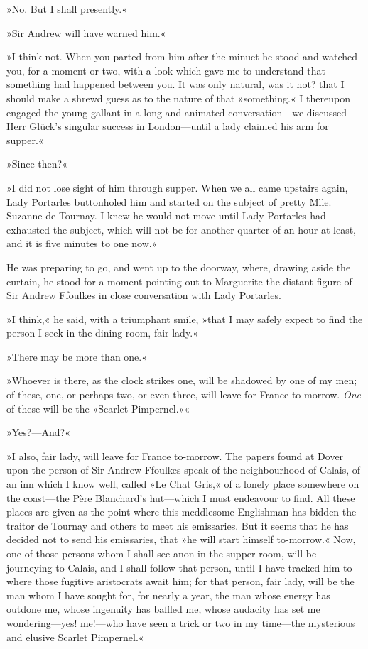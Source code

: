 »No. But I shall presently.«

»Sir Andrew will have warned him.«

»I think not. When you parted from him after the minuet he stood and watched you, for a moment or two, with a look which gave me to understand that something had happened between you. It was only natural, was it not? that I should make a shrewd guess as to the nature of that »something.« I thereupon engaged the young gallant in a long and animated conversation—we discussed Herr Glück's singular success in London—until a lady claimed his arm for supper.«

»Since then?«

»I did not lose sight of him through supper. When we all came upstairs again, Lady Portarles buttonholed him and started on the subject of pretty Mlle. Suzanne de Tournay. I knew he would not move until Lady Portarles had exhausted the subject, which will not be for another quarter of an hour at least, and it is five minutes to one now.«

He was preparing to go, and went up to the doorway, where, drawing aside the curtain, he stood for a moment pointing out to Marguerite the distant figure of Sir Andrew Ffoulkes in close conversation with Lady Portarles.

»I think,« he said, with a triumphant smile, »that I may safely expect to find the person I seek in the dining-room, fair lady.«

»There may be more than one.«

»Whoever is there, as the clock strikes one, will be shadowed by one of my men; of these, one, or perhaps two, or even three, will leave for France to-morrow. \textit{One} of these will be the »Scarlet Pimpernel.««

»Yes?—And?«

»I also, fair lady, will leave for France to-morrow. The papers found at Dover upon the person of Sir Andrew Ffoulkes speak of the neighbourhood of Calais, of an inn which I know well, called »Le Chat Gris,« of a lonely place somewhere on the coast—the Père Blanchard's hut—which I must endeavour to find. All these places are given as the point where this meddlesome Englishman has bidden the traitor de Tournay and others to meet his emissaries. But it seems that he has decided not to send his emissaries, that »he will start himself to-morrow.« Now, one of those persons whom I shall see anon in the supper-room, will be journeying to Calais, and I shall follow that person, until I have tracked him to where those fugitive aristocrats await him; for that person, fair lady, will be the man whom I have sought for, for nearly a year, the man whose energy has outdone me, whose ingenuity has baffled me, whose audacity has set me wondering—yes! me!—who have seen a trick or two in my time—the mysterious and elusive Scarlet Pimpernel.«

